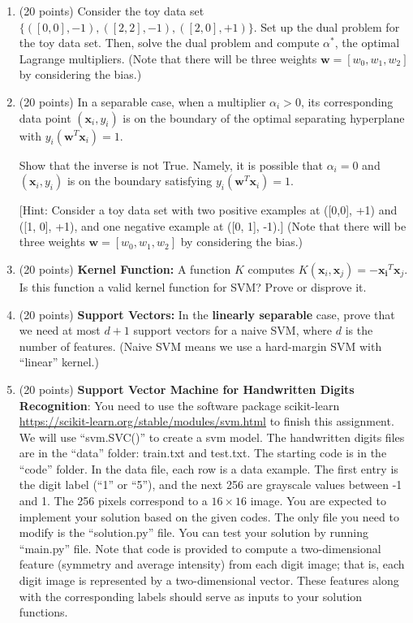 \documentclass[11pt]{article}
\begin{document}
\begin{enumerate}

\item (20 points) Consider the toy data set $\{([0, 0], -1),
([2, 2], -1), ([2, 0], +1)\}$. Set up the dual problem for
the toy data set. Then, solve the dual problem and compute
$\alpha^*$, the optimal Lagrange multipliers. (Note that there will
be three weights $\boldsymbol w = [w_0, w_1, w_2]$ by considering
the bias.)

\item (20 points) In a separable case, when a multiplier
$\alpha_i > 0$, its corresponding data point $(\boldsymbol x_i,
y_i)$ is on the boundary of the optimal separating hyperplane
with $y_i(\boldsymbol w^T \boldsymbol x_i) = 1$.

Show that the inverse is not True. Namely, it is possible that
$\alpha_i = 0$ and $(\boldsymbol x_i, y_i)$ is on the boundary
satisfying $y_i(\boldsymbol w^T \boldsymbol x_i) = 1$.

[Hint: Consider a toy data set with two positive examples at
([0,0], +1) and ([1, 0], +1), and one negative example at ([0,
1], -1).] (Note that there will be three weights $\boldsymbol w =
[w_0, w_1, w_2]$ by considering the bias.)

\item (20 points) \textbf{Kernel Function:} A function $K$
computes $K(\boldsymbol x_i, \boldsymbol x_j) =
-\boldsymbol{x_i}^T \boldsymbol x_j $. Is this function a valid
kernel function for SVM? Prove or disprove it.

\item (20 points) \textbf{Support Vectors:} In the
\textbf{linearly separable} case, prove that we need at most
$d+1$ support vectors for a naive SVM, where $d$ is the number of
features. (Naive SVM means we use a hard-margin SVM with
``linear'' kernel.)

\item (20 points) \textbf{Support Vector Machine for Handwritten
Digits Recognition}: You need to use the software package
scikit-learn
\href{https://scikit-learn.org/stable/modules/svm.html}{https://scikit-learn.org/stable/modules/svm.html}
to finish this assignment. We will use ``svm.SVC()'' to create a
svm model. The handwritten digits files are in the ``data''
folder: train.txt and test.txt. The starting code is in the
``code'' folder. In the data file, each row is a data example.
The first entry is the digit label (``1'' or ``5''), and the next
256 are grayscale values between -1 and 1. The 256 pixels
correspond to a $16\times16$ image. You are expected to implement
your solution based on the given codes. The only file you need to
modify is the ``solution.py'' file. You can test your solution by
running ``main.py'' file. Note that code is provided to compute a
two-dimensional feature (symmetry and average intensity) from
each digit image; that is, each digit image is represented by a
two-dimensional vector. These features along with the
corresponding labels should serve as inputs to your solution
functions.


\end{enumerate}
\end{document}

